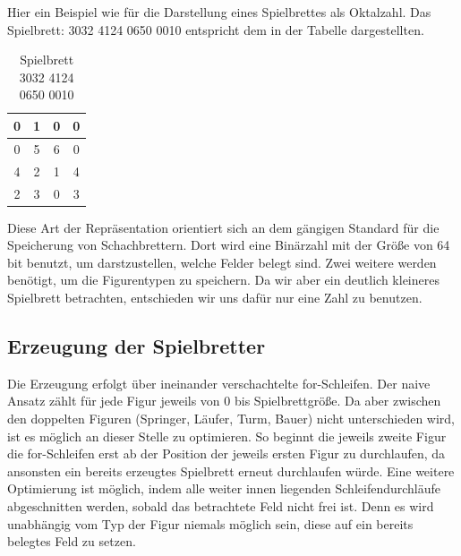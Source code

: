 \documentclass[
	12pt,
	a4paper,
	BCOR10mm,
	DIV14,
	listof=totoc,
	bibliography=totoc,
	headsepline
]{scrreprt}
\begin{document}
Hier ein Beispiel wie für die Darstellung eines Spielbrettes als Oktalzahl.
Das Spielbrett:  3032 4124 0650 0010 entspricht dem in der Tabelle dargestellten.
\begin{table}
	\begin{center}
		\begin{tabular}{|c|c|c|c|}\hline
		 0 &  1 &  0 &  0 \\ \hline
		 0 &  5 &  6 &  0 \\ \hline
		 4 &  2 &  1 & 4 \\ \hline
		 2 &  3 &  0 &  3 \\ \hline
		\end{tabular}
	\end{center}
	\caption{Spielbrett 3032 4124 0650 0010}
	\label{table:Tabelle1}
\end{table} 

Diese Art der Repräsentation orientiert sich an dem gängigen Standard für die Speicherung von Schachbrettern. Dort wird eine Binärzahl mit der Größe von  64 bit benutzt, um darstzustellen, welche Felder belegt sind.
Zwei weitere werden benötigt, um die Figurentypen zu speichern.
Da wir aber ein deutlich kleineres Spielbrett betrachten, entschieden wir uns dafür nur eine Zahl zu benutzen.



\subsection{Erzeugung der Spielbretter}

Die Erzeugung erfolgt über ineinander verschachtelte for-Schleifen.
Der naive Ansatz zählt für jede Figur jeweils von 0 bis Spielbrettgröße.
Da aber zwischen den doppelten Figuren (Springer, Läufer, Turm, Bauer) nicht unterschieden wird, ist es möglich an dieser Stelle zu optimieren.
So beginnt die jeweils zweite Figur die for-Schleifen erst ab der Position der jeweils ersten Figur zu durchlaufen, da ansonsten ein bereits erzeugtes Spielbrett erneut durchlaufen würde.
Eine weitere Optimierung ist möglich, indem alle weiter innen liegenden Schleifendurchläufe abgeschnitten werden, sobald das betrachtete Feld nicht frei ist. Denn es wird unabhängig vom Typ der Figur niemals möglich sein, diese auf ein bereits belegtes Feld zu setzen.
\end{document}
